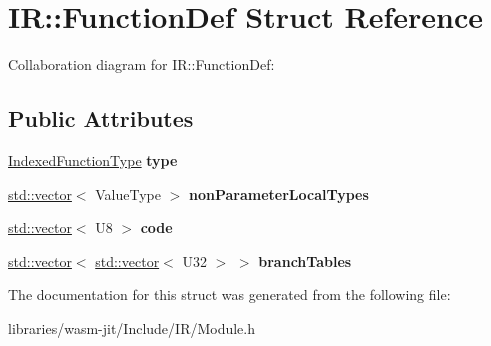 \hypertarget{struct_i_r_1_1_function_def}{}\section{IR\+:\+:Function\+Def Struct Reference}
\label{struct_i_r_1_1_function_def}


Collaboration diagram for IR\+:\+:Function\+Def\+:
\subsection*{Public Attributes}
\begin{DoxyCompactItemize}
\item 
\mbox{\label{struct_i_r_1_1_function_def_a7a9ece54e2500f826e8db353002a0590}} 
\mbox{\hyperlink{struct_i_r_1_1_indexed_function_type}{Indexed\+Function\+Type}} {\bfseries type}
\item 
\mbox{\label{struct_i_r_1_1_function_def_a34738d2b2fa494ebf86433b872fee943}} 
\mbox{\hyperlink{classstd_1_1vector}{std\+::vector}}$<$ Value\+Type $>$ {\bfseries non\+Parameter\+Local\+Types}
\item 
\mbox{\label{struct_i_r_1_1_function_def_a30854c34daa4c0da86950f8a63e59da5}} 
\mbox{\hyperlink{classstd_1_1vector}{std\+::vector}}$<$ U8 $>$ {\bfseries code}
\item 
\mbox{\label{struct_i_r_1_1_function_def_a937cbae37b04e6dd4686bea442c2099b}} 
\mbox{\hyperlink{classstd_1_1vector}{std\+::vector}}$<$ \mbox{\hyperlink{classstd_1_1vector}{std\+::vector}}$<$ U32 $>$ $>$ {\bfseries branch\+Tables}
\end{DoxyCompactItemize}


The documentation for this struct was generated from the following file\+:\begin{DoxyCompactItemize}
\item 
libraries/wasm-\/jit/\+Include/\+I\+R/Module.\+h\end{DoxyCompactItemize}
